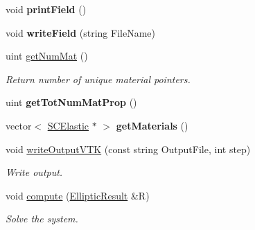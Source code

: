 \begin{DoxyCompactItemize}
\item 
\hypertarget{classvoom_1_1_loop_shell_model_aaeb03eb1a77cb0662c281c9a983652c0}{
void {\bfseries printField} ()}
\label{classvoom_1_1_loop_shell_model_aaeb03eb1a77cb0662c281c9a983652c0}

\item 
\hypertarget{classvoom_1_1_loop_shell_model_a3e9300f9dd92299a5d70a7a46fa252d0}{
void {\bfseries writeField} (string FileName)}
\label{classvoom_1_1_loop_shell_model_a3e9300f9dd92299a5d70a7a46fa252d0}

\item 
\hypertarget{classvoom_1_1_loop_shell_model_ab5586481964527c66a5a858cf45cbb68}{
uint \hyperlink{classvoom_1_1_loop_shell_model_ab5586481964527c66a5a858cf45cbb68}{getNumMat} ()}
\label{classvoom_1_1_loop_shell_model_ab5586481964527c66a5a858cf45cbb68}

\begin{DoxyCompactList}\small\item\em Return number of unique material pointers. \item\end{DoxyCompactList}\item 
\hypertarget{classvoom_1_1_loop_shell_model_a207106c60d43e325958db9dbfb855d2e}{
uint {\bfseries getTotNumMatProp} ()}
\label{classvoom_1_1_loop_shell_model_a207106c60d43e325958db9dbfb855d2e}

\item 
\hypertarget{classvoom_1_1_loop_shell_model_a34355162891da4e1c742e4ebdb72d80c}{
vector$<$ \hyperlink{classvoom_1_1_s_c_elastic}{SCElastic} $\ast$ $>$ {\bfseries getMaterials} ()}
\label{classvoom_1_1_loop_shell_model_a34355162891da4e1c742e4ebdb72d80c}

\item 
\hypertarget{classvoom_1_1_loop_shell_model_afa745eb8fa3844e03ad98596604b7931}{
void \hyperlink{classvoom_1_1_loop_shell_model_afa745eb8fa3844e03ad98596604b7931}{writeOutputVTK} (const string OutputFile, int step)}
\label{classvoom_1_1_loop_shell_model_afa745eb8fa3844e03ad98596604b7931}

\begin{DoxyCompactList}\small\item\em Write output. \item\end{DoxyCompactList}\item 
\hypertarget{classvoom_1_1_loop_shell_model_a7dc070b237987aefa1e32b2be36645a1}{
void \hyperlink{classvoom_1_1_loop_shell_model_a7dc070b237987aefa1e32b2be36645a1}{compute} (\hyperlink{structvoom_1_1_elliptic_result}{EllipticResult} \&R)}
\label{classvoom_1_1_loop_shell_model_a7dc070b237987aefa1e32b2be36645a1}

\begin{DoxyCompactList}\small\item\em Solve the system. \item\end{DoxyCompactList}\end{DoxyCompactItemize}
